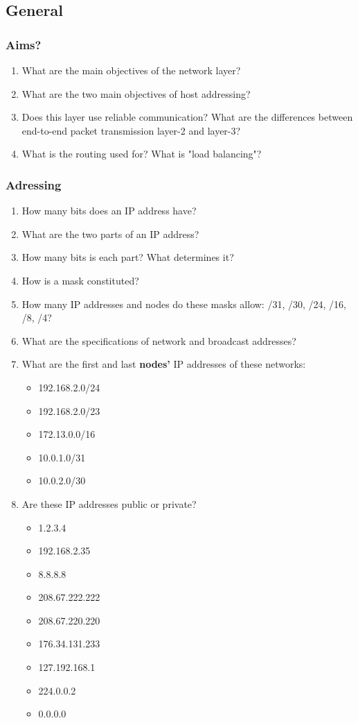 \documentclass[11pt]{article}
\begin{document}
\subsection{General}
\subsubsection{Aims?}
\begin{enumerate}
  \item What are the main objectives of the network layer?
  \item What are the two main objectives of host addressing?
  \item Does this layer use reliable communication? What are the differences between end-to-end packet transmission layer-2 and layer-3?
  \item What is the routing used for? What is "load balancing"?
\end{enumerate}
\subsubsection{Adressing}
\begin{enumerate}
  \item How many bits does an IP address have?
  \item What are the two parts of an IP address?
  \item How many bits is each part? What determines it?
  \item How is a mask constituted?
  \item How many IP addresses and nodes do these masks allow: /31, /30, /24, /16, /8, /4?
  \item What are the specifications of network and broadcast addresses?
  \item What are the first and last \textbf{nodes'} IP addresses of these networks:
    \begin{itemize}
      \item 192.168.2.0/24
      \item 192.168.2.0/23
      \item 172.13.0.0/16
      \item 10.0.1.0/31
      \item 10.0.2.0/30
    \end{itemize}
  \item Are these IP addresses public or private?
    \begin{itemize}
      \item 1.2.3.4
      \item 192.168.2.35
      \item 8.8.8.8
      \item 208.67.222.222
      \item 208.67.220.220
      \item 176.34.131.233
      \item 127.192.168.1
      \item 224.0.0.2
      \item 0.0.0.0
    \end{itemize}
\end{enumerate}
\end{document}

